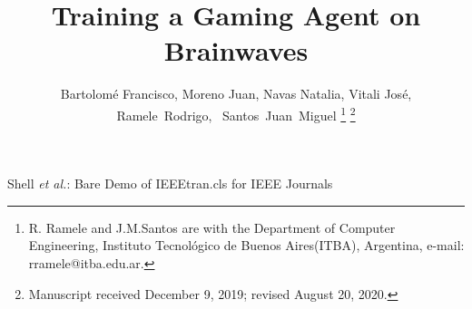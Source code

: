 \documentclass[journal]{IEEEtran}
\begin{document}
%
\title{Training a Gaming Agent on Brainwaves}
%
%
%

\author{Bartolomé Francisco, Moreno Juan,  Navas Natalia, Vitali José, \\
Ramele~Rodrigo,~
        Santos~Juan~Miguel%
\thanks{R. Ramele and J.M.Santos are with the Department
of Computer Engineering, Instituto Tecnológico de Buenos Aires(ITBA), Argentina,
e-mail: rramele@itba.edu.ar.}%
\thanks{Manuscript received December 9, 2019; revised August 20, 2020.}}

%
%



%
{Shell \MakeLowercase{\textit{et al.}}: Bare Demo of IEEEtran.cls for IEEE Journals}
%
\end{document}
